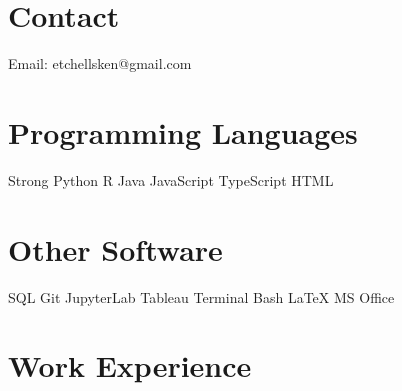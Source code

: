 \documentclass[]{cv-style}          %
\begin{document}


\begin{aside}
%
\section{Contact}
Email:
etchellsken@gmail.com

\section{Programming
   Languages}
Strong Python
R
Java
JavaScript
TypeScript
HTML

\section{Other Software}
SQL
Git
JupyterLab
Tableau
Terminal
Bash
\LaTeX
MS Office

\end{aside}






\section{Work Experience}
\end{document}
